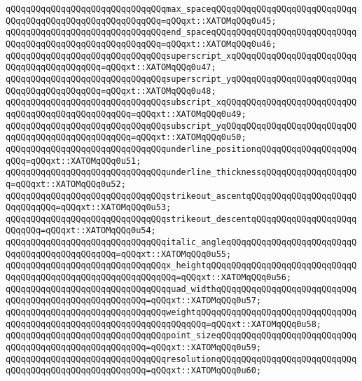 \verb|qQQqqQQqqQQqqQQqqQQqqQQqqQQqqQQqmax_spaceqQQqqQQqqQQqqQQqqQQqqQQqqQQqqQQqqQQqqQQqqQQqqQQqqQQqqQQqqQQq=qQQqxt::XATOMqQQq0u45;|\newline
\verb|qQQqqQQqqQQqqQQqqQQqqQQqqQQqqQQqend_spaceqQQqqQQqqQQqqQQqqQQqqQQqqQQqqQQqqQQqqQQqqQQqqQQqqQQqqQQqqQQq=qQQqxt::XATOMqQQq0u46;|\newline
\verb|qQQqqQQqqQQqqQQqqQQqqQQqqQQqqQQqsuperscript_xqQQqqQQqqQQqqQQqqQQqqQQqqQQqqQQqqQQqqQQqqQQq=qQQqxt::XATOMqQQq0u47;|\newline
\verb|qQQqqQQqqQQqqQQqqQQqqQQqqQQqqQQqsuperscript_yqQQqqQQqqQQqqQQqqQQqqQQqqQQqqQQqqQQqqQQqqQQq=qQQqxt::XATOMqQQq0u48;|\newline
\verb|qQQqqQQqqQQqqQQqqQQqqQQqqQQqqQQqsubscript_xqQQqqQQqqQQqqQQqqQQqqQQqqQQqqQQqqQQqqQQqqQQqqQQqqQQq=qQQqxt::XATOMqQQq0u49;|\newline
\verb|qQQqqQQqqQQqqQQqqQQqqQQqqQQqqQQqsubscript_yqQQqqQQqqQQqqQQqqQQqqQQqqQQqqQQqqQQqqQQqqQQqqQQqqQQq=qQQqxt::XATOMqQQq0u50;|\newline
\verb|qQQqqQQqqQQqqQQqqQQqqQQqqQQqqQQqunderline_positionqQQqqQQqqQQqqQQqqQQqqQQq=qQQqxt::XATOMqQQq0u51;|\newline
\verb|qQQqqQQqqQQqqQQqqQQqqQQqqQQqqQQqunderline_thicknessqQQqqQQqqQQqqQQqqQQq=qQQqxt::XATOMqQQq0u52;|\newline
\verb|qQQqqQQqqQQqqQQqqQQqqQQqqQQqqQQqstrikeout_ascentqQQqqQQqqQQqqQQqqQQqqQQqqQQqqQQq=qQQqxt::XATOMqQQq0u53;|\newline
\verb|qQQqqQQqqQQqqQQqqQQqqQQqqQQqqQQqstrikeout_descentqQQqqQQqqQQqqQQqqQQqqQQqqQQq=qQQqxt::XATOMqQQq0u54;|\newline
\verb|qQQqqQQqqQQqqQQqqQQqqQQqqQQqqQQqitalic_angleqQQqqQQqqQQqqQQqqQQqqQQqqQQqqQQqqQQqqQQqqQQqqQQq=qQQqxt::XATOMqQQq0u55;|\newline
\verb|qQQqqQQqqQQqqQQqqQQqqQQqqQQqqQQqx_heightqQQqqQQqqQQqqQQqqQQqqQQqqQQqqQQqqQQqqQQqqQQqqQQqqQQqqQQqqQQqqQQq=qQQqxt::XATOMqQQq0u56;|\newline
\verb|qQQqqQQqqQQqqQQqqQQqqQQqqQQqqQQqquad_widthqQQqqQQqqQQqqQQqqQQqqQQqqQQqqQQqqQQqqQQqqQQqqQQqqQQqqQQq=qQQqxt::XATOMqQQq0u57;|\newline
\verb|qQQqqQQqqQQqqQQqqQQqqQQqqQQqqQQqweightqQQqqQQqqQQqqQQqqQQqqQQqqQQqqQQqqQQqqQQqqQQqqQQqqQQqqQQqqQQqqQQqqQQqqQQq=qQQqxt::XATOMqQQq0u58;|\newline
\verb|qQQqqQQqqQQqqQQqqQQqqQQqqQQqqQQqpoint_sizeqQQqqQQqqQQqqQQqqQQqqQQqqQQqqQQqqQQqqQQqqQQqqQQqqQQqqQQq=qQQqxt::XATOMqQQq0u59;|\newline
\verb|qQQqqQQqqQQqqQQqqQQqqQQqqQQqqQQqresolutionqQQqqQQqqQQqqQQqqQQqqQQqqQQqqQQqqQQqqQQqqQQqqQQqqQQqqQQq=qQQqxt::XATOMqQQq0u60;|\newline

